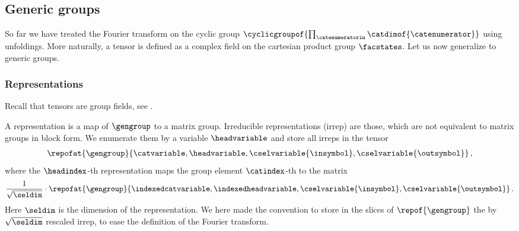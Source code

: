 \subsection{Generic groups}

So far we have treated the Fourier transform on the cyclic group $\cyclicgroupof{\prod_{\catenumeratorin}\catdimof{\catenumerator}}$ using unfoldings.
More naturally, a tensor is defined as a complex field on the cartesian product group $\facstates$.
Let us now generalize to generic groups.

\subsubsection{Representations}

Recall that tensors are group fields, see .

A representation is a map of $\gengroup$ to a matrix group.
Irreducible representations (irrep) are those, which are not equivalent to matrix groups in block form.
We enumerate them by a variable $\headvariable$ and store all irreps in the tensor
\begin{align*}
    \repofat{\gengroup}{
        \catvariable,\headvariable,\cselvariable{\insymbol},\cselvariable{\outsymbol}
    } \, ,
\end{align*}
where the $\headindex$-th representation maps the group element $\catindex$-th to the matrix
\begin{align*}
    \frac{1}{\sqrt{\seldim}} \cdot \repofat{\gengroup}{
        \indexedcatvariable,\indexedheadvariable,\cselvariable{\insymbol},\cselvariable{\outsymbol}
    } \, .
\end{align*}
Here $\seldim$ is the dimension of the representation.
We here made the convention to store in the slices of $\repof{\gengroup}$ the by ${\sqrt{\seldim}}$ rescaled irrep, to ease the definition of the Fourier transform.




